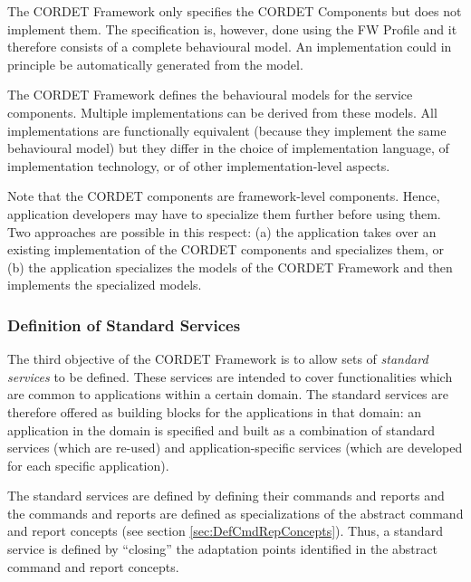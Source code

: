 \documentclass{pnp_article}
\begin{document}
The CORDET Framework only specifies the CORDET Components but does not implement them. 
The specification is, however, done using the FW Profile and it therefore consists of a complete behavioural model. 
An implementation could in principle be automatically generated from the model. 

The CORDET Framework defines the behavioural models for the service components. 
Multiple implementations can be derived from these models. 
All implementations are functionally equivalent (because they implement the same behavioural model) but they differ in the choice of implementation language, of implementation technology, or of other implementation-level aspects. 

Note that the CORDET components are framework-level components. 
Hence, application developers may have to specialize them further before using them. 
Two approaches are possible in this respect: (a) the application takes over an existing implementation of the CORDET components and specializes them, or (b) the application specializes the models of the CORDET Framework and then implements the specialized models.

\subsubsection{Definition of Standard Services}\label{sec:StdServ}
The third objective of the CORDET Framework is to allow sets of \textit{standard services} to be defined. 
These services are intended to cover functionalities which are common to applications within a certain domain. 
The standard services are therefore offered as building blocks for the applications in that domain: 
an application in the domain is specified and built as a combination of standard services (which are re-used) and application-specific services (which are developed for each specific application).

The standard services are defined by defining their commands and reports and the commands and reports are defined as specializations of the abstract command and report concepts (see section \ref{sec:DefCmdRepConcepts}). 
Thus, a standard service is defined by “closing” the adaptation points identified in the abstract command and report concepts.
\end{document}
